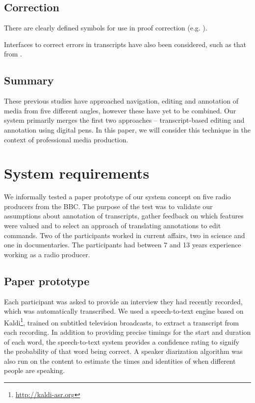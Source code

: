 \subsection{Correction}
There are clearly defined symbols for use in proof correction (e.g. \citet{ISO5776}).

Interfaces to correct errors in transcripts have also been considered, such as that from \citet{Suhm2001}.

\subsection{Summary}
These previous studies have approached navigation, editing and annotation of media from five different angles, however
these have yet to be combined.  Our system primarily merges the first two approaches -- transcript-based editing and
annotation using digital pens. In this paper, we will consider this technique in the context of professional media
production.

\section{System requirements}\label{sec:paper-requirements}




We informally tested a paper prototype of our system concept on five radio producers from the BBC. The purpose of the
test was to validate our assumptions about annotation of transcripts, gather feedback on which features were valued and
to select an approach of translating annotations to edit commands.  Two of the participants worked in current affairs,
two in science and one in documentaries. The participants had between 7 and 13 years experience working as a radio
producer.

\subsection{Paper prototype}
Each participant was asked to provide an interview they had recently recorded, which was automatically transcribed.  We
used a speech-to-text engine based on Kaldi\footnote{\url{http://kaldi-asr.org}}, trained on subtitled television
broadcasts, to extract a transcript from each recording. In addition to providing precise timings for the start and
duration of each word, the speech-to-text system provides a confidence rating to signify the probability of that word
being correct. A speaker diarization \citep{AngueraMiro2012} algorithm was also run on the content to estimate the
times and identities of when different people are speaking.

